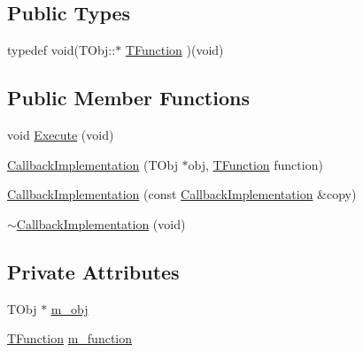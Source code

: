 \subsection*{Public Types}
\begin{DoxyCompactItemize}
\item 
typedef void(T\-Obj\-::$\ast$ \hyperlink{class_callback_implementation_3_01_t_obj_00_01_empty_class_00_01_empty_class_00_01_empty_class_00_01_empty_class_01_4_afdd9e1b4fc45011f9b611354beefd863}{T\-Function} )(void)
\end{DoxyCompactItemize}
\subsection*{Public Member Functions}
\begin{DoxyCompactItemize}
\item 
void \hyperlink{class_callback_implementation_3_01_t_obj_00_01_empty_class_00_01_empty_class_00_01_empty_class_00_01_empty_class_01_4_a6616760359f6fb770dcda510c5ca024f}{Execute} (void)
\item 
\hyperlink{class_callback_implementation_3_01_t_obj_00_01_empty_class_00_01_empty_class_00_01_empty_class_00_01_empty_class_01_4_a31ad7fbf89cb549250bbfee3dff96673}{Callback\-Implementation} (T\-Obj $\ast$obj, \hyperlink{class_callback_implementation_3_01_t_obj_00_01_empty_class_00_01_empty_class_00_01_empty_class_00_01_empty_class_01_4_afdd9e1b4fc45011f9b611354beefd863}{T\-Function} function)
\item 
\hyperlink{class_callback_implementation_3_01_t_obj_00_01_empty_class_00_01_empty_class_00_01_empty_class_00_01_empty_class_01_4_a2d216081cf6078a62079e2d7625187a1}{Callback\-Implementation} (const \hyperlink{class_callback_implementation}{Callback\-Implementation} \&copy)
\item 
\hyperlink{class_callback_implementation_3_01_t_obj_00_01_empty_class_00_01_empty_class_00_01_empty_class_00_01_empty_class_01_4_ad518ee43f319216abf94ac6df5fadbfc}{$\sim$\-Callback\-Implementation} (void)
\end{DoxyCompactItemize}
\subsection*{Private Attributes}
\begin{DoxyCompactItemize}
\item 
T\-Obj $\ast$ \hyperlink{class_callback_implementation_3_01_t_obj_00_01_empty_class_00_01_empty_class_00_01_empty_class_00_01_empty_class_01_4_abca47b166a7dc66ab2bd6cf5a19b3f7e}{m\-\_\-obj}
\item 
\hyperlink{class_callback_implementation_3_01_t_obj_00_01_empty_class_00_01_empty_class_00_01_empty_class_00_01_empty_class_01_4_afdd9e1b4fc45011f9b611354beefd863}{T\-Function} \hyperlink{class_callback_implementation_3_01_t_obj_00_01_empty_class_00_01_empty_class_00_01_empty_class_00_01_empty_class_01_4_a2089dd97f18a5aec58920e8b53c33056}{m\-\_\-function}
\end{DoxyCompactItemize}


